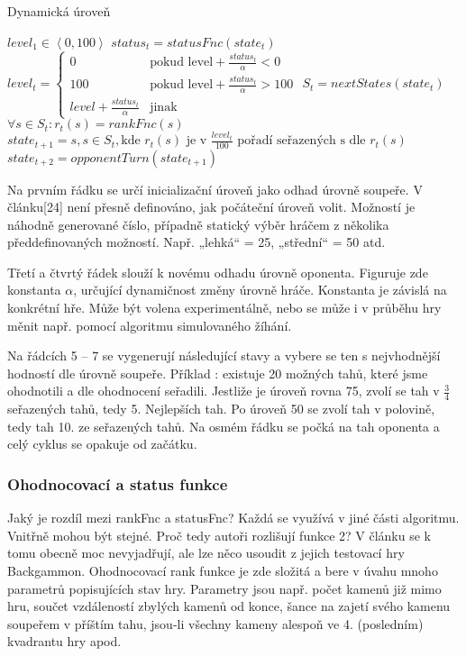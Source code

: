 \begin{algorithm}
\caption{Dynamická úroveň}
\label{alg-dynlevel}
\begin{algorithmic}[1]
\State $level_1 \in \left\langle 0, 100 \right\rangle$
	 \State $status_t = statusFnc(state_t)$
	 \State $level_t = \begin{cases}
											  0 & \text{pokud level} + \frac{status_t}{\alpha} < 0 \\
												100 & \text{pokud level} + \frac{status_t}{\alpha} > 100 \\
												level + \frac{status_t}{\alpha}  & \text{jinak}
										 \end{cases}
						 $
   \State $S_t = nextStates(state_t)$
	 \State $\forall s \in S_t : r_t(s) = rankFnc(s)$
	 \State $state_{t+1} = s, s \in S_t, \text{kde } r_t(s) \text{ je v } \frac{level_t}{100} \text{ pořadí seřazených s dle } r_t(s)$
	 \State $state_{t+2} = opponentTurn(state_{t+1})$
\EndFor
\end{algorithmic}
\end{algorithm}

Na prvním řádku se určí inicializační úroveň jako odhad úrovně soupeře. V článku[24] není přesně definováno, jak počáteční úroveň volit. Možností je náhodně generované číslo, případně statický výběr hráčem z několika předdefinovaných možností. Např. „lehká“ = 25, „střední“ = 50 atd.

Třetí a čtvrtý řádek slouží k novému odhadu úrovně oponenta. Figuruje zde konstanta $\alpha$, určující dynamičnost změny úrovně hráče. Konstanta je závislá na konkrétní hře. Může být volena experimentálně, nebo se může i v průběhu hry měnit např. pomocí algoritmu simulovaného žíhání.

Na řádcích 5 – 7 se vygenerují následující stavy a vybere se ten s nejvhodnější hodností dle úrovně soupeře. Příklad : existuje 20 možných tahů, které jsme ohodnotili a dle ohodnocení seřadili. Jestliže je úroveň rovna 75, zvolí se tah v $\frac{3}{4}$ seřazených tahů, tedy 5. Nejlepších tah. Po úroveň 50 se zvolí tah v polovině, tedy tah 10. ze seřazených tahů.
Na osmém řádku se počká na tah oponenta a celý cyklus se opakuje od začátku.

\subsubsection{Ohodnocovací a status funkce}

Jaký je rozdíl mezi rankFnc a statusFnc? Každá se využívá v jiné části algoritmu. Vnitřně mohou být stejné. Proč tedy autoři rozlišují funkce 2? V článku se k tomu obecně moc nevyjadřují, ale lze něco usoudit z jejich testovací hry Backgammon.
Ohodnocovací rank funkce je zde složitá a bere v úvahu mnoho parametrů popisujících stav hry. Parametry jsou např. počet kamenů již mimo hru, součet vzdáleností zbylých kamenů od konce, šance na zajetí svého kamenu soupeřem v příštím tahu, jsou-li všechny kameny alespoň ve 4. (posledním) kvadrantu hry apod.

